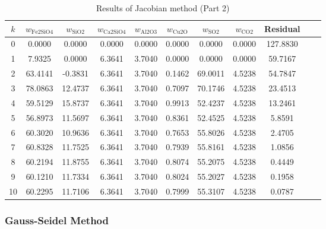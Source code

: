 \documentclass[10pt]{article}
\begin{document}
\begin{table}[H]
\centering
\caption{Results of Jacobian method (Part 2)}
\begin{tabular}{ccccccccccc}
\toprule
\( k \) & \( w_{\text{Fe2SiO4}} \) & \( w_{\text{SiO2}} \) & \( w_{\text{Ca2SiO4}} \) & \( w_{\text{Al2O3}} \) & \( w_{\text{Cu2O}} \) & \( w_{\text{SO2}} \) & \( w_{\text{CO2}} \) & Residual \\
\midrule
0 & 0.0000 & 0.0000 & 0.0000 & 0.0000 & 0.0000 & 0.0000 & 0.0000 & 127.8830 \\
1 & 7.9325 & 0.0000 & 6.3641 & 3.7040 & 0.0000 & 0.0000 & 0.0000 & 59.7167 \\
2 & 63.4141 & -0.3831 & 6.3641 & 3.7040 & 0.1462 & 69.0011 & 4.5238 & 54.7847 \\
3 & 78.0863 & 12.4737 & 6.3641 & 3.7040 & 0.7097 & 70.1746 & 4.5238 & 23.4513 \\
4 & 59.5129 & 15.8737 & 6.3641 & 3.7040 & 0.9913 & 52.4237 & 4.5238 & 13.2461 \\
5 & 56.8973 & 11.5697 & 6.3641 & 3.7040 & 0.8361 & 52.4525 & 4.5238 & 5.8591 \\
6 & 60.3020 & 10.9636 & 6.3641 & 3.7040 & 0.7653 & 55.8026 & 4.5238 & 2.4705 \\
7 & 60.8328 & 11.7525 & 6.3641 & 3.7040 & 0.7939 & 55.8161 & 4.5238 & 1.0856 \\
8 & 60.2194 & 11.8755 & 6.3641 & 3.7040 & 0.8074 & 55.2075 & 4.5238 & 0.4449 \\
9 & 60.1210 & 11.7334 & 6.3641 & 3.7040 & 0.8024 & 55.2027 & 4.5238 & 0.1958 \\
10 & 60.2295 & 11.7106 & 6.3641 & 3.7040 & 0.7999 & 55.3107 & 4.5238 & 0.0787 \\
\bottomrule
\end{tabular}
\end{table}





\subsubsection{Gauss-Seidel Method}
\end{document}
